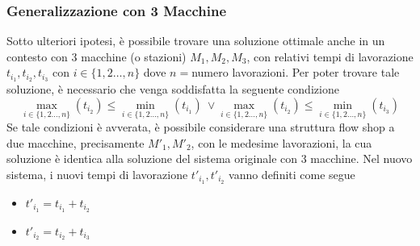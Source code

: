 \documentclass[10pt, letterpaper]{report}
\begin{document}
\subsubsection{Generalizzazione con 3 Macchine}
Sotto ulteriori ipotesi, è possibile trovare una soluzione ottimale anche in un contesto con 3 macchine (o stazioni) $M_1,M_2,M_3$, 
con relativi tempi di lavorazione $t_{i_1},t_{i_2},t_{i_3}$ con $i\in\{1,2\dots ,n\}$ dove $n=$numero 
lavorazioni. Per poter 
trovare tale soluzione, è necessario che venga soddisfatta la seguente condizione 
$$ \max_{i\in\{1,2\dots ,n\}}(t_{i_2})\le \min_{i\in\{1,2\dots ,n\}}(t_{i_1}) \ \lor  
\max_{i\in\{1,2\dots ,n\}}(t_{i_2}) \le \min_{i\in\{1,2\dots ,n\}}(t_{i_3}) $$
Se tale condizioni è avverata, è possibile considerare una struttura flow shop a due macchine, precisamente $M'_1,M'_2$, con le 
medesime lavorazioni, la cua soluzione è identica alla soluzione del sistema originale con 3 macchine.\acc 
Nel nuovo sistema, i nuovi tempi di lavorazione $t'_{i_1},t'_{i_2}$ vanno definiti come segue \begin{itemize}
    \item $t'_{i_1}=t_{i_1}+t_{i_2}$
    \item $t'_{i_2}=t_{i_2}+t_{i_3}$
\end{itemize}
\end{document}
